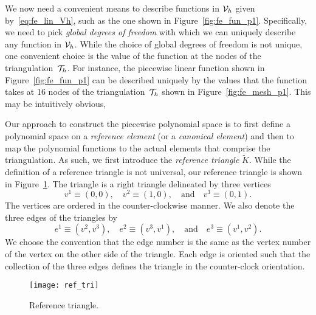 We now need a convenient means to describe functions in $\mathcal{V}_h$ given by~\eqref{eq:fe_lin_Vh}, such as the one shown in Figure~\ref{fig:fe_fun_p1}.  Specifically, we need to pick \emph{global degrees of freedom} with which we can uniquely describe any function in $\mathcal{V}_h$.  While the choice of global degrees of freedom is not unique, one convenient choice is the value of the function at the nodes of the triangulation~$\mathcal{T}_h$.  For instance, the piecewise linear function shown in Figure~\ref{fig:fe_fun_p1} can be described uniquely by the values that the function takes at 16 nodes of the triangulation~$\mathcal{T}_h$ shown in Figure~\ref{fig:fe_mesh_p1}.  This may be intuitively obvious, 



Our approach to construct the piecewise polynomial space is to first define a polynomial space on a \emph{reference element} (or a \emph{canonical element}) and then to map the polynomial functions to the actual elements that comprise the triangulation.  As such, we first introduce the \emph{reference triangle} $\tilde K$.  While the definition of a reference triangle is not universal, our reference triangle is shown in Figure~\ref{fig:fe_ref_tri}.  The triangle is a right triangle delineated by three vertices
\begin{equation*}
  v^1 \equiv (0,0), \quad v^2 \equiv (1,0), \quad \text{and} \quad v^3 \equiv (0,1).
\end{equation*}
The vertices are ordered in the counter-clockwise manner. We also denote the three edges of the triangles by
\begin{equation*}
  e^1 \equiv (v^2,v^3), \quad e^2 \equiv (v^3,v^1), \quad \text{and} \quad e^3 \equiv (v^1,v^2).
\end{equation*}
We choose the convention that the edge number is the same as the vertex number of the vertex on the other side of the triangle. Each edge is oriented such that the collection of the three edges defines the triangle in the counter-clock orientation.  

\begin{figure}
  \centering
  \texttt{[image: ref\_tri]}
  \caption{Reference triangle.}
  \label{fig:fe_ref_tri}
\end{figure}


